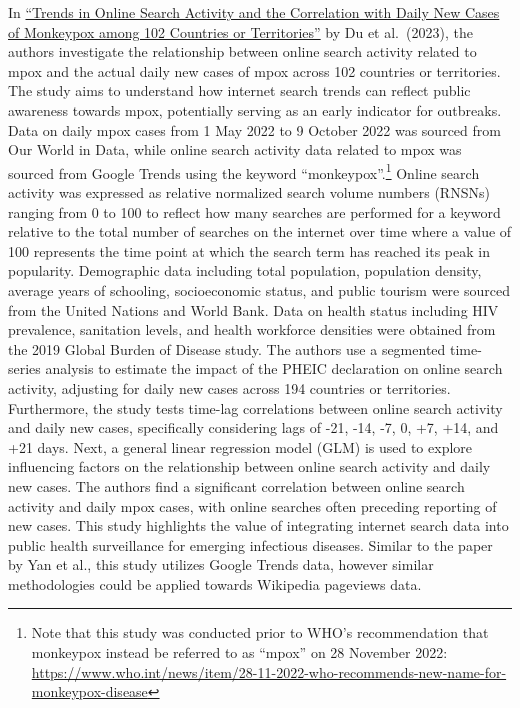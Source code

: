 \documentclass[
  letterpaper,
  DIV=11,
  numbers=noendperiod]{scrartcl}
\begin{document}
In \href{https://doi.org/10.3390/ijerph20043395}{``Trends in Online
Search Activity and the Correlation with Daily New Cases of Monkeypox
among 102 Countries or Territories''} by Du et al.~(2023), the authors
investigate the relationship between online search activity related to
mpox and the actual daily new cases of mpox across 102 countries or
territories. The study aims to understand how internet search trends can
reflect public awareness towards mpox, potentially serving as an early
indicator for outbreaks. Data on daily mpox cases from 1 May 2022 to 9
October 2022 was sourced from Our World in Data, while online search
activity data related to mpox was sourced from Google Trends using the
keyword ``monkeypox''.\footnote{Note that this study was conducted prior
  to WHO's recommendation that monkeypox instead be referred to as
  ``mpox'' on 28 November 2022:
  \url{https://www.who.int/news/item/28-11-2022-who-recommends-new-name-for-monkeypox-disease}}
Online search activity was expressed as relative normalized search
volume numbers (RNSNs) ranging from 0 to 100 to reflect how many
searches are performed for a keyword relative to the total number of
searches on the internet over time where a value of 100 represents the
time point at which the search term has reached its peak in popularity.
Demographic data including total population, population density, average
years of schooling, socioeconomic status, and public tourism were
sourced from the United Nations and World Bank. Data on health status
including HIV prevalence, sanitation levels, and health workforce
densities were obtained from the 2019 Global Burden of Disease study.
The authors use a segmented time-series analysis to estimate the impact
of the PHEIC declaration on online search activity, adjusting for daily
new cases across 194 countries or territories. Furthermore, the study
tests time-lag correlations between online search activity and daily new
cases, specifically considering lags of -21, -14, -7, 0, +7, +14, and
+21 days. Next, a general linear regression model (GLM) is used to
explore influencing factors on the relationship between online search
activity and daily new cases. The authors find a significant correlation
between online search activity and daily mpox cases, with online
searches often preceding reporting of new cases. This study highlights
the value of integrating internet search data into public health
surveillance for emerging infectious diseases. Similar to the paper by
Yan et al., this study utilizes Google Trends data, however similar
methodologies could be applied towards Wikipedia pageviews data.
\end{document}
